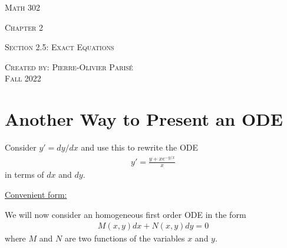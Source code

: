 \documentclass[12pt,a4paper]{article}
\newcounter{example}[section]
\begin{document}
\thispagestyle{empty}

\begin{center}
\vspace*{2.5cm}

{\Huge \textsc{Math 302}}

\vspace*{2cm}

{\LARGE \textsc{Chapter 2}} 

\vspace*{0.75cm}

\noindent\textsc{Section 2.5: Exact Equations}

\vspace*{0.75cm}

\tableofcontents

\vfill

\noindent \textsc{Created by: Pierre-Olivier Paris{\'e}} \\
\textsc{Fall 2022}
\end{center}

\newpage

\section{Another Way to Present an ODE}

\begin{example}
Consider $y' = dy/dx$ and use this to rewrite the ODE
	\begin{align*}
	y' = \frac{y + xe^{-y/x}}{x}
	\end{align*}
in terms of $dx$ and $dy$.
\end{example}

\vfill

\underline{Convenient form:}

We will now consider an homogeneous first order ODE in the form
	\begin{align}
	M(x, y) dx + N (x, y) dy = 0 \label{Eq:ExactForm}
	\end{align}
where $M$ and $N$ are two functions of the variables $x$ and $y$.
\end{document}
